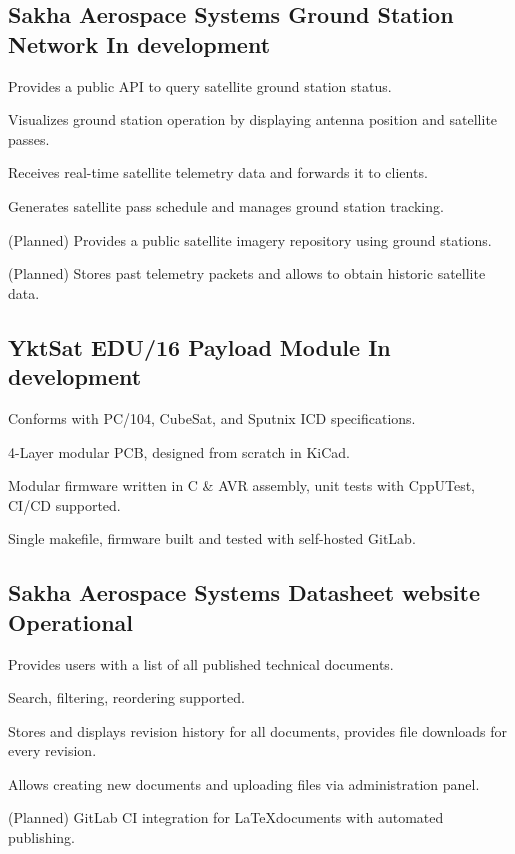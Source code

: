 \documentclass[letter,10pt]{article}
\begin{document}
\subsection{{Sakha Aerospace Systems Ground Station Network \hfill In development}}
\begin{zitemize}
\item Provides a public API to query satellite ground station status.
\item Visualizes ground station operation by displaying antenna position and satellite passes.
\item Receives real-time satellite telemetry data and forwards it to clients.
\item Generates satellite pass schedule and manages ground station tracking.
\item (Planned) Provides a public satellite imagery repository using ground stations.
\item (Planned) Stores past telemetry packets and allows to obtain historic satellite data.
\end{zitemize}

\subsection{{YktSat EDU/16 Payload Module \hfill In development}}
\begin{zitemize}
\item Conforms with PC/104, CubeSat, and Sputnix ICD specifications.
\item 4-Layer modular PCB, designed from scratch in KiCad.
\item Modular firmware written in C \& AVR assembly, unit tests with CppUTest, CI/CD supported.
\item Single makefile, firmware built and tested with self-hosted GitLab.
\end{zitemize}

\subsection{{Sakha Aerospace Systems Datasheet website \hfill Operational}}
\begin{zitemize}
\item Provides users with a list of all published technical documents.
\item Search, filtering, reordering supported.
\item Stores and displays revision history for all documents, provides file downloads for every revision.
\item Allows creating new documents and uploading files via administration panel.
\item (Planned) GitLab CI integration for \LaTeX documents with automated publishing.
\end{zitemize}
\end{document}
